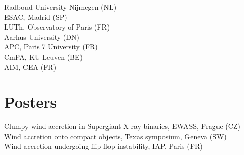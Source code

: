 \begin{flushleft}
\noindent{} Radboud University Nijmegen (NL)\\
\vspace*{0.1cm}
\noindent{} ESAC, Madrid (SP)\\
\vspace*{0.1cm}
\noindent{} LUTh, Observatory of Paris (FR)\\
\vspace*{0.1cm}
\noindent{} Aarhus University (DN)\\
\vspace*{0.1cm}
\noindent{} APC, Paris 7 University (FR)\\
\vspace*{0.1cm}
\noindent{} CmPA, KU Leuven (BE)\\
\vspace*{0.1cm}
\noindent{} AIM, CEA (FR)\\
\end{flushleft}

\section*{Posters}
       
\begin{flushleft}
\noindent{} Clumpy wind accretion in Supergiant X-ray binaries, EWASS, Prague (CZ)\\
\vspace*{0.1cm}
\noindent{} Wind accretion onto compact objects, Texas symposium, Geneva (SW)\\
\vspace*{0.1cm}
\noindent{} Wind accretion undergoing flip-flop instability, IAP, Paris (FR)\\

\end{flushleft}

